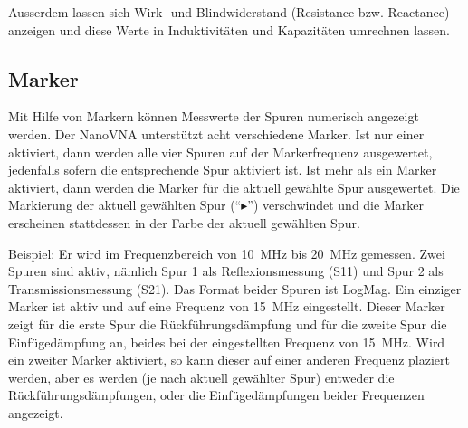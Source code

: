 \documentclass[twoside,a4paper,11pt,halfparskip,DIV=11,notitlepage]{scrartcl}
\begin{document}
Ausserdem lassen sich Wirk- und Blindwiderstand (Resistance bzw. Reactance) anzeigen und diese Werte
in Induktivitäten und Kapazitäten umrechnen lassen.

\subsection{Marker}
\begin{center}\end{center}

Mit Hilfe von Markern können Messwerte der Spuren numerisch angezeigt werden. Der NanoVNA
unterstützt acht verschiedene Marker. Ist nur einer aktiviert, dann werden alle vier
Spuren auf der Markerfrequenz ausgewertet, jedenfalls sofern die entsprechende
Spur aktiviert ist. Ist mehr als ein Marker aktiviert, dann werden die Marker für die
aktuell gewählte Spur ausgewertet. Die Markierung der aktuell gewählten Spur (``$\blacktriangleright$'')
verschwindet und die Marker erscheinen stattdessen in der Farbe der aktuell gewählten Spur.

Beispiel: Er wird im Frequenzbereich von 10~MHz bis 20~MHz gemessen. Zwei Spuren sind aktiv,
nämlich Spur 1 als Reflexionsmessung (S11) und Spur 2 als Transmissionsmessung (S21). Das Format beider
Spuren ist LogMag. Ein einziger Marker ist aktiv und auf eine Frequenz von
15~MHz eingestellt. Dieser Marker zeigt für die erste Spur die Rückführungsdämpfung und für
die zweite Spur die Einfügedämpfung an, beides bei der eingestellten Frequenz von 15~MHz. Wird
ein zweiter Marker aktiviert, so kann dieser auf einer anderen Frequenz plaziert werden, aber
es werden (je nach aktuell gewählter Spur) entweder die Rückführungsdämpfungen, oder die
Einfügedämpfungen beider Frequenzen angezeigt.
\end{document}
